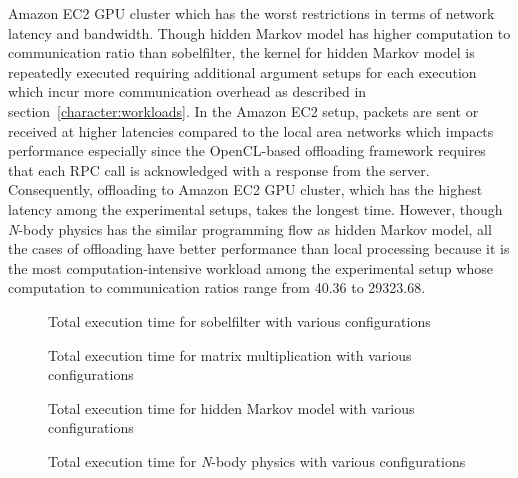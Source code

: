 Amazon EC2 GPU cluster which has the worst restrictions in terms of
network latency and bandwidth.
%
Though hidden Markov model has higher computation to communication
ratio than sobelfilter, the kernel for hidden Markov model is repeatedly executed 
requiring additional argument setups for each execution which incur 
more communication overhead as described in
section~\ref{character:workloads}.
%
In the Amazon EC2 setup, packets are sent or received at higher
latencies compared to the local area networks which impacts performance
especially since the OpenCL-based offloading framework requires that each RPC call is
acknowledged with a response from the server.
%
Consequently, offloading to Amazon EC2 GPU cluster, which has the
highest latency among the experimental setups, takes the longest time.
%
However, though {\it N}-body physics has the similar programming flow
as hidden Markov model, all the cases of offloading have better
performance than local processing because it is the most
computation-intensive workload among the experimental setup whose
computation to communication ratios range from 40.36 to 29323.68. 
%
\begin{figure}
\centering
{}
\caption{Total execution time for sobelfilter with various
configurations}
\label{fig:time_sobelfilter}
\end{figure}
%
\begin{figure}
\centering
{}
\caption{Total execution time for matrix multiplication with various
configurations}
\label{fig:time_matrix}
\end{figure}
%
\begin{figure}
\centering
{}
\caption{Total execution time for hidden Markov model with various
configurations}
\label{fig:time_hmm}
\end{figure}
%
\begin{figure}
\centering
{}
\caption{Total execution time for {\it N}-body physics with various
configurations}
\label{fig:time_nbody}
\end{figure}
%
